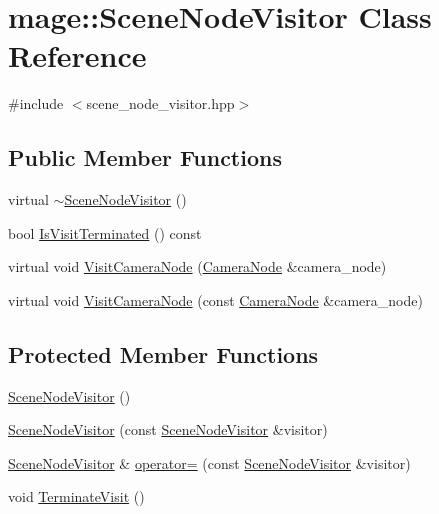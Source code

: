 \hypertarget{classmage_1_1_scene_node_visitor}{}\section{mage\+:\+:Scene\+Node\+Visitor Class Reference}
\label{classmage_1_1_scene_node_visitor}


{\ttfamily \#include $<$scene\+\_\+node\+\_\+visitor.\+hpp$>$}

\subsection*{Public Member Functions}
\begin{DoxyCompactItemize}
\item 
virtual \hyperlink{classmage_1_1_scene_node_visitor_ac45f02e28abeeb9220b0be954ca6a513}{$\sim$\+Scene\+Node\+Visitor} ()
\item 
bool \hyperlink{classmage_1_1_scene_node_visitor_a0f654e306f6d43d49081f319cd41812b}{Is\+Visit\+Terminated} () const
\item 
virtual void \hyperlink{classmage_1_1_scene_node_visitor_a01d831e494396ab678ce0c29b008a398}{Visit\+Camera\+Node} (\hyperlink{classmage_1_1_camera_node}{Camera\+Node} \&camera\+\_\+node)
\item 
virtual void \hyperlink{classmage_1_1_scene_node_visitor_a4a3bb0c3ad6253c919259efabbccfab9}{Visit\+Camera\+Node} (const \hyperlink{classmage_1_1_camera_node}{Camera\+Node} \&camera\+\_\+node)
\end{DoxyCompactItemize}
\subsection*{Protected Member Functions}
\begin{DoxyCompactItemize}
\item 
\hyperlink{classmage_1_1_scene_node_visitor_a6a259a0ce19107bb644482b86c4bd27a}{Scene\+Node\+Visitor} ()
\item 
\hyperlink{classmage_1_1_scene_node_visitor_a44e30ba9858c231f4bad0a2b7fffbe29}{Scene\+Node\+Visitor} (const \hyperlink{classmage_1_1_scene_node_visitor}{Scene\+Node\+Visitor} \&visitor)
\item 
\hyperlink{classmage_1_1_scene_node_visitor}{Scene\+Node\+Visitor} \& \hyperlink{classmage_1_1_scene_node_visitor_a4e3c71d7df6c589a81dffd5d8d285c1d}{operator=} (const \hyperlink{classmage_1_1_scene_node_visitor}{Scene\+Node\+Visitor} \&visitor)
\item 
void \hyperlink{classmage_1_1_scene_node_visitor_a8fe1b3469cbb97d4086cb030128fa28c}{Terminate\+Visit} ()
\end{DoxyCompactItemize}
